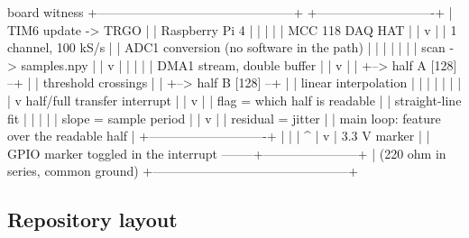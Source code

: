 \begin{asciiart}
  board                                                      witness
  +-----------------------------------------------+          +----------------------------+
  | TIM6 update -> TRGO                            |          | Raspberry Pi 4             |
  |   |                                            |          |   MCC 118 DAQ HAT          |
  |   v                                            |          |   1 channel, 100 kS/s      |
  | ADC1 conversion (no software in the path)      |          |                            |
  |   |                                            |          |   scan -> samples.npy      |
  |   v                                            |          |        |                   |
  | DMA1 stream, double buffer                     |          |        v                   |
  |   +--> half A [128] --+                        |          |   threshold crossings      |
  |   +--> half B [128] --+                        |          |   linear interpolation     |
  |            |                                   |          |        |                   |
  |            v  half/full transfer interrupt     |          |        v                   |
  |   flag = which half is readable                |          |   straight-line fit        |
  |            |                                   |          |   slope = sample period    |
  |            v                                   |          |   residual = jitter        |
  |   main loop: feature over the readable half    |          +----------------------------+
  |            |                                   |                       ^
  |            v                                   |   3.3 V marker        |
  |   GPIO marker toggled in the interrupt --------+-----------------------+
  |                                               (220 ohm in series, common ground)
  +-----------------------------------------------+
\end{asciiart}

\subsection*{Repository layout}

